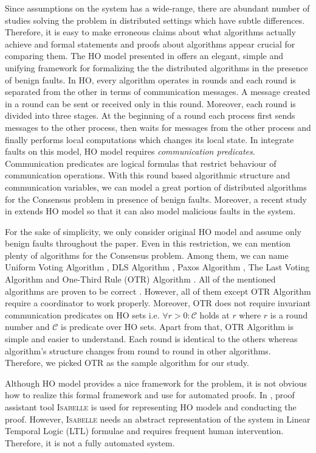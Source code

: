 \documentclass{llncs}
\begin{document}
Since assumptions on the system has a wide-range, there are abundant number of studies solving the problem in distributed settings which have subtle differences. Therefore, it is easy to make erroneous claims about what algorithms actually achieve and formal statements and proofs about algorithms appear crucial for comparing them. The HO model presented in \cite{charron09} offers an elegant, simple and unifying framework for formalizing the the distributed algorithms in the presence of benign faults. In HO, every algorithm operates in rounds and each round is separated from the other in terms of communication messages. A message created in a round can be sent or received only in this round. Moreover, each round is divided into three stages. At the beginning of a round each process first sends messages to the other process, then waits for messages from the other process and finally performs local computations which changes its local state. In integrate faults on this model, HO model requires \emph{communication predicates}. Communication predicates are logical formulas that restrict behaviour of communication operations. With this round based algorithmic structure and communication variables, we can model a great portion of distributed algorithms for the Consensus problem in presence of benign faults. Moreover, a recent study in \cite{charron11} extends HO model so that it can also model malicious faults in the system. 

For the sake of simplicity, we only consider original HO model and assume only benign faults throughout the paper. Even in this restriction, we can mention plenty of algorithms for the Consensus problem. Among them, we can name Uniform Voting Algorithm \cite{charron09}, DLS Algorithm \cite{dwork88}, Paxos Algorithm \cite{lamport98}, The Last Voting Algorithm \cite{charron09} and One-Third Rule (OTR) Algorithm \cite{charron09}. All of the mentioned algorithms are proven to be correct \cite{debrat12}. However, all of them except OTR Algorithm require a coordinator to work properly. Moreover, OTR does not require invariant communication predicates on HO sets i.e. $\forall r>0 : \mathcal{C}$ holds at $r$ where $r$ is a round number and $\mathcal{C}$ is predicate over HO sets. Apart from that, OTR Algorithm is simple and easier to understand. Each round is identical to the others whereas algorithm's structure changes from round to round in other algorithms. Therefore, we picked OTR as the sample algorithm for our study.

Although HO model provides a nice framework for the problem, it is not obvious how to realize this formal framework and use for automated proofs. In \cite{debrat12}, proof assistant tool \textsc{Isabelle} is used for representing HO models and conducting the proof. However, \textsc{Isabelle} needs an abstract representation of the system in Linear Temporal Logic (LTL) formulae and requires frequent human intervention. Therefore, it is not a fully automated system. 
\end{document}
